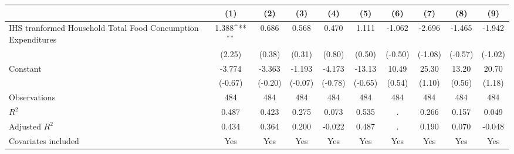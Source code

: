 {
\def\sym#1{\ifmmode^{#1}\else\(^{#1}\)\fi}
\begin{tabular}{l*{9}{c}}
\hline\hline
                    &\multicolumn{1}{c}{(1)}         &\multicolumn{1}{c}{(2)}         &\multicolumn{1}{c}{(3)}         &\multicolumn{1}{c}{(4)}         &\multicolumn{1}{c}{(5)}         &\multicolumn{1}{c}{(6)}         &\multicolumn{1}{c}{(7)}         &\multicolumn{1}{c}{(8)}         &\multicolumn{1}{c}{(9)}         \\
\hline
IHS tranformed Household Total Food Concumption Expenditures&       1.388\sym{**} &       0.686         &       0.568         &       0.470         &       1.111         &      -1.062         &      -2.696         &      -1.465         &      -1.942         \\
                    &      (2.25)         &      (0.38)         &      (0.31)         &      (0.80)         &      (0.50)         &     (-0.50)         &     (-1.08)         &     (-0.57)         &     (-1.02)         \\
[1em]
Constant            &      -3.774         &      -3.363         &      -1.193         &      -4.173         &      -13.13         &       10.49         &       25.30         &       13.20         &       20.70         \\
                    &     (-0.67)         &     (-0.20)         &     (-0.07)         &     (-0.78)         &     (-0.65)         &      (0.54)         &      (1.10)         &      (0.56)         &      (1.18)         \\
\hline
Observations        &         484         &         484         &         484         &         484         &         484         &         484         &         484         &         484         &         484         \\
\(R^{2}\)           &       0.487         &       0.423         &       0.275         &       0.073         &       0.535         &           .         &       0.266         &       0.157         &       0.049         \\
Adjusted \(R^{2}\)  &       0.434         &       0.364         &       0.200         &      -0.022         &       0.487         &           .         &       0.190         &       0.070         &      -0.048         \\
Covariates included &         Yes         &         Yes         &         Yes         &         Yes         &         Yes         &         Yes         &         Yes         &         Yes         &         Yes         \\

\end{tabular}}
